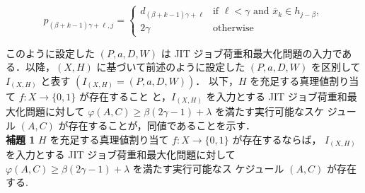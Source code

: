 \documentclass[12pt]{optlab-bachelor}
\begin{document}
$$p_{(\beta + k - 1)\gamma + \ell, j} = \left\{ \begin{array}{ll} d_{(\beta + k - 1)\gamma + \ell} & \text{if } \ell < \gamma \text{ and } \bar x_k \in h_{j - \beta}, \\ 2\gamma & \text{otherwise} \end{array} \right.$$

このように設定した $(P,a,D,W)$ は JIT ジョブ荷重和最大化問題の入力である．以降，$(X,H)$ に基づいて前述のように設定した $(P,a,D,W)$ を区別して $I_{(X,H)}$ と表す $(I_{(X,H)} = (P,a,D,W))$．
以下，$H$ を充足する真理値割り当て $f : X \to \{0,1\}$ が存在すること
と，$I_{(X,H)}$ を入力とする JIT ジョブ荷重和最大化問題に対して
$\varphi(A,C) \ge \beta(2\gamma - 1) + \lambda$ を満たす実行可能なスケ
ジュール $(A,C)$ が存在することが，同値であることを示す．\\

\noindent \textbf{補題 1}
$H$ を充足する真理値割り当て $f : X \to \{0,1\}$ が存在するならば，
$I_{(X,H)}$ を入力とする JIT ジョブ荷重和最大化問題に対して
$\varphi(A, C) \ge \beta(2\gamma - 1) + \lambda$ を満たす実行可能なス
ケジュール $(A, C)$ が存在する.\\
\end{document}
